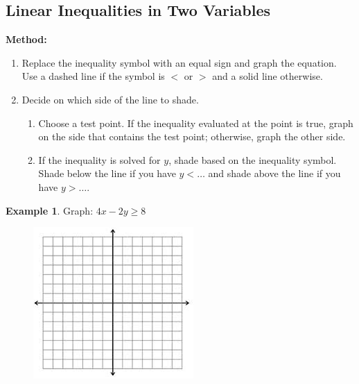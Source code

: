 \documentclass[addpoints,12pt]{exam}
\theoremstyle{definition}
\newtheorem{example}{Example}[subsection]
\begin{document}
\setcounter{section}{9}
\setcounter{subsection}{3}

\subsection{Linear Inequalities in Two Variables}

\begin{mdframed}
\textbf{Method:}
\begin{enumerate}
\item Replace the inequality symbol with an equal sign and graph the equation. Use a dashed line if the symbol is $<$ or $>$ and a solid line otherwise.
\item Decide on which side of the line to shade.
\begin{enumerate}
\item Choose a test point. If the inequality evaluated at the point is true, graph on the side that contains the test point; otherwise, graph the other side.
\item If the inequality is solved for $y$, shade based on the inequality symbol. Shade below the line if you have $y <\dots$ and shade above the line if you have $y > \dots$.
\end{enumerate}
\end{enumerate}
\end{mdframed}

\vspace{.3in}

\begin{example}
Graph: $4x - 2y \ge 8$
\begin{figure}[h]
\hfill\includegraphics[scale=1.25]{images/plane}
\end{figure}
\vspace{1in}
\end{example}

\newpage
\end{document}
